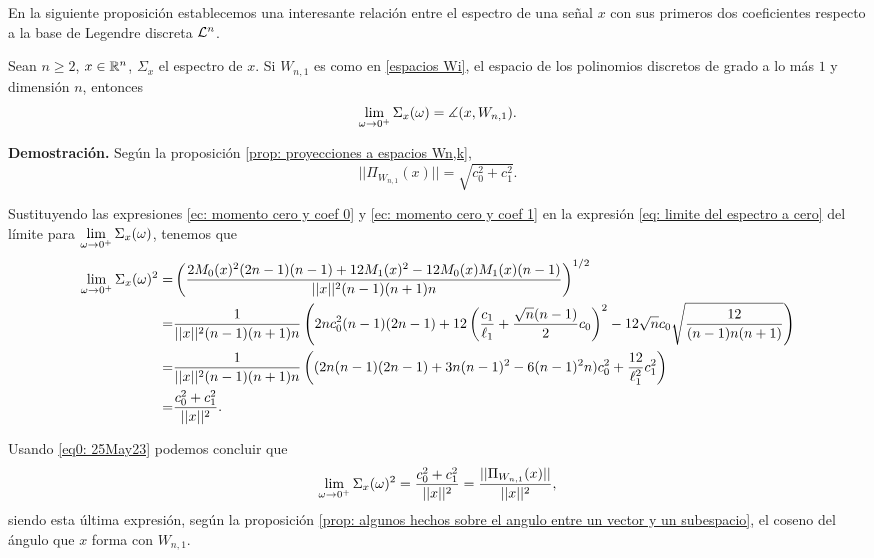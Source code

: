 En la siguiente proposición establecemos
una interesante relación entre el espectro de una señal $x$
con sus primeros dos coeficientes respecto a la base
de Legendre discreta $\mathcal{L}^{n}$.
\begin{prop}
\label{prop: relacion limite cero con legendre}
Sean $n \geq 2$, $x \in \mathbb{R}^{n}$,
$\Sigma_{x}$ el espectro de $x$.
Si $W_{n,1}$ es como en 
\eqref{espacios Wi}, el espacio
de los polinomios discretos de grado 
a lo más $1$ y dimensión $n$, entonces
\begin{equation}
\label{eq: limite por cero como angulo}
\lim\limits_{\omega \rightarrow 0^{+}}{
\Sigma_{x}(\omega)} = \measuredangle(x, W_{n,1}).
\end{equation}
\end{prop}
\noindent
\textbf{Demostración.}
Según la proposición 
\ref{prop: proyecciones a espacios Wn,k}, 
\begin{equation}
\label{eq0: 25May23} 
||\Pi_{W_{n,1}}(x)|| = \sqrt{c_{0}^{2} + c_{1}^{2}}.
\end{equation}

Sustituyendo las expresiones 
\eqref{ec: momento cero y coef 0} y
\eqref{ec: momento cero y coef 1} en la expresión 
\eqref{eq: limite del espectro a cero} del límite para 
$\lim\limits_{\omega \rightarrow 0^{+}}{\Sigma_{x}(\omega)}$,
tenemos que
\begin{align*}
\lim\limits_{\omega \rightarrow 0^{+}}{\Sigma_{x}(\omega)^{2}}
= & 
\left(
\frac{
2M_{0}(x)^{2}(2n-1)(n-1) + 12M_{1}(x)^{2} - 12M_{0}(x)M_{1}(x)(n-1)
}{
||x||^{2} (n-1)(n+1)n}
\right)^{1/2} \\
= & \frac{1}{||x||^{2}
(n-1)(n+1)n
} 
\left(
2nc_{0}^{2}(n-1)(2n-1) + 12
\left(
\frac{c_{1}}{\ell_{1}} + 
\frac{\sqrt{n}(n-1)}{2}c_{0}
\right)^{2}-12
\sqrt{n} c_{0} \sqrt{\frac{12}{
(n-1)n(n+1)
}} 
\right) \\
= & \frac{1}{||x||^{2}
(n-1)(n+1)n}
\left(
(2n(n-1)(2n-1) + 3n(n-1)^{2}-6(n-1)^{2}n)c_{0}^{2}
+ \frac{12}{\ell^{2}_{1}}c_{1}^{2}
\right) \\
= & \frac{c_{0}^{2} + c_{1}^{2}}{||x||^{2}}.
\end{align*}

Usando \eqref{eq0: 25May23} podemos concluir
que
\[
\lim\limits_{\omega \rightarrow 0^{+}}{\Sigma_{x}(\omega)^{2}}
=  \frac{c_{0}^{2} + c_{1}^{2}}{||x||^{2}}
=  \frac{||\Pi_{W_{n,1}}(x)||}{||x||^{2}},
\]
siendo esta última expresión, según la proposición
\ref{prop: algunos hechos sobre el angulo entre un vector y un subespacio}, 
el coseno del ángulo que $x$ forma con $W_{n,1}$.  
\QEDB
\vspace{0.2cm}

